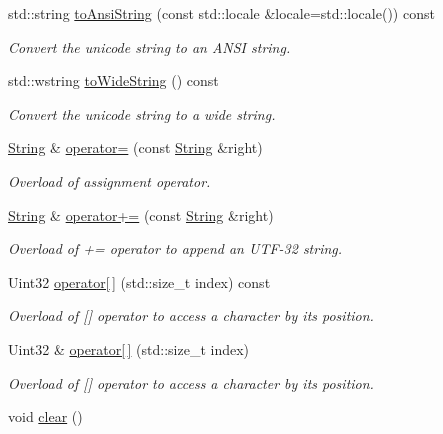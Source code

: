 \begin{DoxyCompactItemize}
std\+::string \hyperlink{classsf_1_1_string_a71d111ccfaf295b8b8be8ca4a3ceb5f4}{to\+Ansi\+String} (const std\+::locale \&locale=std\+::locale()) const 
\begin{DoxyCompactList}\small\item\em Convert the unicode string to an A\+N\+S\+I string. \end{DoxyCompactList}\item 
std\+::wstring \hyperlink{classsf_1_1_string_afd8b085ad7255543e4dc1285389d2d82}{to\+Wide\+String} () const 
\begin{DoxyCompactList}\small\item\em Convert the unicode string to a wide string. \end{DoxyCompactList}\item 
\hyperlink{classsf_1_1_string}{String} \& \hyperlink{classsf_1_1_string_a096255c066e5ef8c31952216b8ce9c42}{operator=} (const \hyperlink{classsf_1_1_string}{String} \&right)
\begin{DoxyCompactList}\small\item\em Overload of assignment operator. \end{DoxyCompactList}\item 
\hyperlink{classsf_1_1_string}{String} \& \hyperlink{classsf_1_1_string_ae6563ce2c243ae2160eea8a354199f4e}{operator+=} (const \hyperlink{classsf_1_1_string}{String} \&right)
\begin{DoxyCompactList}\small\item\em Overload of += operator to append an U\+T\+F-\/32 string. \end{DoxyCompactList}\item 
Uint32 \hyperlink{classsf_1_1_string_a649b89a65866bf03652f7b5cb6de3bb6}{operator\mbox{[}$\,$\mbox{]}} (std\+::size\+\_\+t index) const 
\begin{DoxyCompactList}\small\item\em Overload of \mbox{[}\mbox{]} operator to access a character by its position. \end{DoxyCompactList}\item 
Uint32 \& \hyperlink{classsf_1_1_string_abc989da7f4fb873ab29188d40772ab24}{operator\mbox{[}$\,$\mbox{]}} (std\+::size\+\_\+t index)
\begin{DoxyCompactList}\small\item\em Overload of \mbox{[}\mbox{]} operator to access a character by its position. \end{DoxyCompactList}\item 
void \hyperlink{classsf_1_1_string_a391c1b4950cbf3d3f8040cea73af2969}{clear} ()

\end{DoxyCompactItemize}
